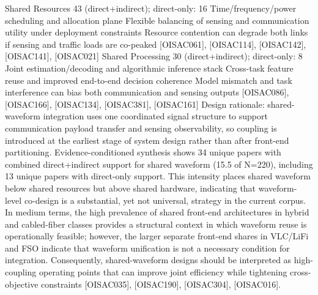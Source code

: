 {}\markdownRendererPipe{} Shared Resources \markdownRendererPipe{} 43 (direct+indirect); direct-only: 16 \markdownRendererPipe{} Time/frequency/power scheduling and allocation plane \markdownRendererPipe{} Flexible balancing of sensing and communication utility under deployment constraints \markdownRendererPipe{} Resource contention can degrade both links if sensing and traffic loads are co-peaked \markdownRendererPipe{} [O\markdownRendererUnderscore{}ISAC\markdownRendererUnderscore{}061], [O\markdownRendererUnderscore{}ISAC\markdownRendererUnderscore{}114], [O\markdownRendererUnderscore{}ISAC\markdownRendererUnderscore{}142], [O\markdownRendererUnderscore{}ISAC\markdownRendererUnderscore{}141], [O\markdownRendererUnderscore{}ISAC\markdownRendererUnderscore{}021] \markdownRendererPipe{}\markdownRendererSoftLineBreak
{}\markdownRendererPipe{} Shared Processing \markdownRendererPipe{} 30 (direct+indirect); direct-only: 8 \markdownRendererPipe{} Joint estimation/decoding and algorithmic inference stack \markdownRendererPipe{} Cross-task feature reuse and improved end-to-end decision coherence \markdownRendererPipe{} Model mismatch and task interference can bias both communication and sensing outputs \markdownRendererPipe{} [O\markdownRendererUnderscore{}ISAC\markdownRendererUnderscore{}086], [O\markdownRendererUnderscore{}ISAC\markdownRendererUnderscore{}166], [O\markdownRendererUnderscore{}ISAC\markdownRendererUnderscore{}134], [O\markdownRendererUnderscore{}ISAC\markdownRendererUnderscore{}381], [O\markdownRendererUnderscore{}ISAC\markdownRendererUnderscore{}161] \markdownRendererPipe{}\markdownRendererInterblockSeparator
{}\markdownRendererSectionBegin
{}\markdownRendererInterblockSeparator
{}Design rationale: shared-waveform integration uses one coordinated signal structure to support communication payload transfer and sensing observability, so coupling is introduced at the earliest stage of system design rather than after front-end partitioning.\markdownRendererParagraphSeparator
{}Evidence-conditioned synthesis shows 34 unique papers with combined direct+indirect support for shared waveform (15.5\markdownRendererPercentSign{} of N=220), including 13 unique papers with direct-only support. This intensity places shared waveform below shared resources but above shared hardware, indicating that waveform-level co-design is a substantial, yet not universal, strategy in the current corpus. In medium terms, the high prevalence of shared front-end architectures in hybrid and cabled-fiber classes provides a structural context in which waveform reuse is operationally feasible; however, the larger separate front-end shares in VLC/LiFi and FSO indicate that waveform unification is not a necessary condition for integration. Consequently, shared-waveform designs should be interpreted as high-coupling operating points that can improve joint efficiency while tightening cross-objective constraints [O\markdownRendererUnderscore{}ISAC\markdownRendererUnderscore{}035], [O\markdownRendererUnderscore{}ISAC\markdownRendererUnderscore{}190], [O\markdownRendererUnderscore{}ISAC\markdownRendererUnderscore{}304], [O\markdownRendererUnderscore{}ISAC\markdownRendererUnderscore{}016].\markdownRendererParagraphSeparator
